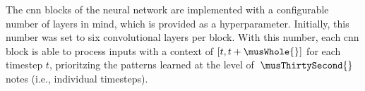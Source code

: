 
The \gls{cnn} blocks of the neural network are implemented
with a configurable number of layers in mind, which is
provided as a hyperparameter. Initially, this number was set
to six convolutional layers per block. With this number,
each \gls{cnn} block is able to process inputs with a
context of $[t, t + \musWhole{}]$ for each timestep $t$,
prioritzing the patterns learned at the level of $\:
\musThirtySecond{} \:$ notes (i.e., individual timesteps).
